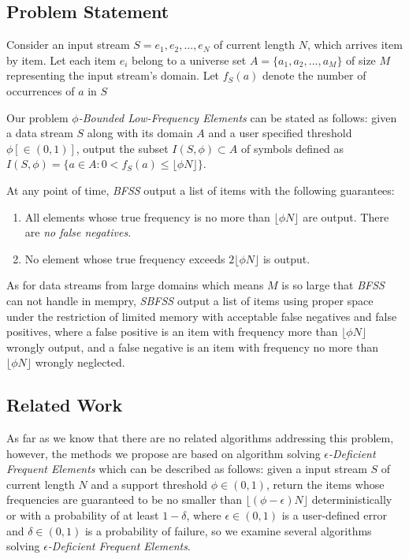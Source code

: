 \documentclass[conference]{IEEEtran}
\begin{document}
\subsection{Problem Statement}
Consider an input stream $S = e_1,e_2,..., e_N$ of current length $N$, which arrives item by item. Let each item $e_i$ belong to a universe set $A=\{a_1,a_2,...,a_M\}$ of size $M$ representing the input stream's domain. Let $f_S(a)$ denote the number of occurrences of $a$ in $S$\par

Our problem $\phi$\emph{-Bounded Low-Frequency Elements} can be stated as follows: given a data stream $S$ along with its domain $A$ and a user specified threshold $\phi[\in (0,1)]$, output the subset $I(S,\phi) \subset A$ of symbols defined as $I(S,\phi) = \{a\in A : 0 < f_S(a)\leq\lfloor \phi N\rfloor\}$.\par

At any point of time, \emph{BFSS} output a list of items with the following guarantees: 
\begin{enumerate}
\item  All elements whose true frequency is no more than $\lfloor\phi N\rfloor$ are output. There are \emph{no false negatives}.
\item  No element whose true frequency exceeds $2\lfloor\phi N\rfloor$ is output.
\end{enumerate} 

As for data streams from large domains which means $M$ is so large that \emph{BFSS} can not handle in mempry, \emph{SBFSS} output a list of items using proper space under the restriction of limited memory with acceptable false negatives and false positives, where a false positive is an item with frequency more than $\lfloor\phi N\rfloor$ wrongly output, and a false negative is an item with frequency no more than $\lfloor\phi N\rfloor$ wrongly neglected.

\subsection{Related Work}
As far as we know that there are no related algorithms addressing this problem, however, the methods we propose are based on algorithm solving $\epsilon$\emph{-Deficient Frequent Elements} which can be described as follows: given a input stream $S$ of current length $N$ and a support threshold $\phi \in (0,1)$, return the items whose frequencies are guaranteed to be no smaller than $\lfloor(\phi-\epsilon)N\rfloor$ deterministically or with a probability of at least $1-\delta$, where $\epsilon \in (0,1)$ is a user-defined error and $\delta \in (0,1)$ is a probability of failure, so we examine several algorithms solving $\epsilon$\emph{-Deficient Frequent Elements}.\par
\end{document}
